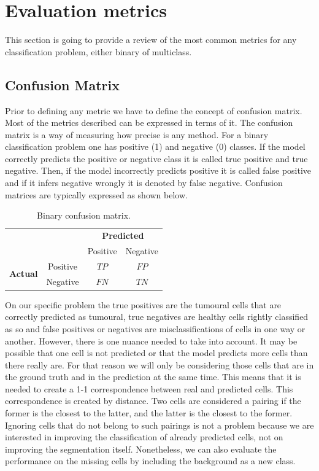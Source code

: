 \section{Evaluation metrics}\label{sec:metrics}

This section is going to provide a review of the most common metrics for any classification problem, either binary of multiclass. 

\subsection{Confusion Matrix}\label{subsec:conf}

Prior to defining any metric we have to define the concept of confusion matrix. Most of the metrics described can be expressed in terms of it. The confusion matrix is a way of measuring how precise is any method. For a binary classification problem one has positive (1) and negative (0) classes. If the model correctly predicts the positive or negative class it is called true positive and true negative. Then, if the model incorrectly predicts positive it is called false positive and if it infers negative wrongly it is denoted by false negative. Confusion matrices are typically expressed as shown below.

\begin{table}[ht]
\centering
\caption{Binary confusion matrix.}
\begin{tabular}{c c c|c|}
& & \multicolumn{2}{c}{\textbf{Predicted}} \\ \cline{3-4}
& & \multicolumn{1}{|c|}{Positive} & Negative \\ \cline{2-4}
\multirow{2}{*}{\textbf{Actual}} & \multicolumn{1}{|c|}{Positive} & $TP$ & $FP$ \\ \cline{2-4}
                     & \multicolumn{1}{|c|}{Negative} & $FN$ & $TN$ \\ \cline{2-4}
\end{tabular}
\label{table:confusion_matrix}
\end{table}

On our specific problem the true positives are the tumoural cells that are correctly predicted as tumoural, true negatives are healthy cells rightly classified as so and false positives or negatives are misclassifications of cells in one way or another. However, there is one nuance needed to take into account. It may be possible that one cell is not predicted or that the model predicts more cells than there really are. For that reason we will only be considering those cells that are in the ground truth and in the prediction at the same time. This means that it is needed to create a 1-1 correspondence between real and predicted cells. This correspondence is created by distance. Two cells are considered a pairing if the former is the closest to the latter, and the latter is the closest to the former. Ignoring cells that do not belong to such pairings is not a problem because we are interested in improving the classification of already predicted cells, not on improving the segmentation itself. Nonetheless, we can also evaluate the performance on the missing cells by including the background as a new class.


